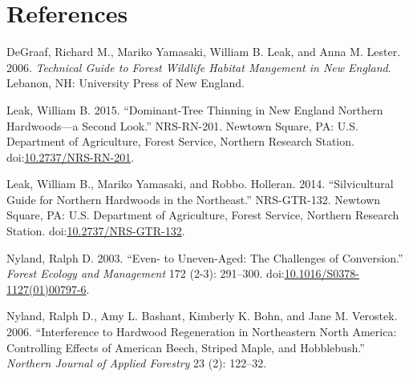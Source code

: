 \documentclass[]{tufte-handout}
\begin{document}
\newpage

\section{References}\label{references}

\setlength{\parindent}{0pt} \setlength{\parskip}{1.5em}

\hypertarget{refs}{}
\hypertarget{ref-degraaf_technical_2006}{}
DeGraaf, Richard M., Mariko Yamasaki, William B. Leak, and Anna M.
Lester. 2006. \emph{Technical Guide to Forest Wildlife Habitat Mangement
in New England}. Lebanon, NH: University Press of New England.

\hypertarget{ref-leak_dominant-tree_2015}{}
Leak, William B. 2015. ``Dominant-Tree Thinning in New England Northern
Hardwoods---a Second Look.'' NRS-RN-201. Newtown Square, PA: U.S.
Department of Agriculture, Forest Service, Northern Research Station.
doi:\href{https://doi.org/10.2737/NRS-RN-201}{10.2737/NRS-RN-201}.

\hypertarget{ref-leak_silvicultural_2014}{}
Leak, William B., Mariko Yamasaki, and Robbo. Holleran. 2014.
``Silvicultural Guide for Northern Hardwoods in the Northeast.''
NRS-GTR-132. Newtown Square, PA: U.S. Department of Agriculture, Forest
Service, Northern Research Station.
doi:\href{https://doi.org/10.2737/NRS-GTR-132}{10.2737/NRS-GTR-132}.

\hypertarget{ref-nyland_even-_2003}{}
Nyland, Ralph D. 2003. ``Even- to Uneven-Aged: The Challenges of
Conversion.'' \emph{Forest Ecology and Management} 172 (2-3): 291--300.
doi:\href{https://doi.org/10.1016/S0378-1127(01)00797-6}{10.1016/S0378-1127(01)00797-6}.

\hypertarget{ref-nyland_interference_2006}{}
Nyland, Ralph D., Amy L. Bashant, Kimberly K. Bohn, and Jane M.
Verostek. 2006. ``Interference to Hardwood Regeneration in Northeastern
North America: Controlling Effects of American Beech, Striped Maple, and
Hobblebush.'' \emph{Northern Journal of Applied Forestry} 23 (2):
122--32.
\end{document}
